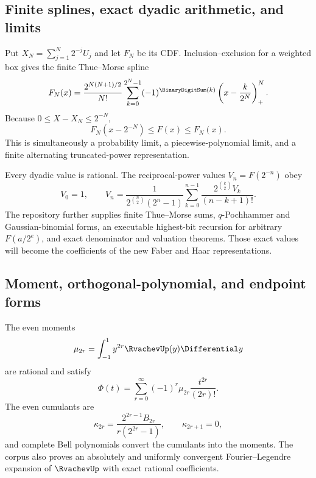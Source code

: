 \documentclass[11pt]{article}
\theoremstyle{definition}
\theoremstyle{remark}
\begin{document}
\subsection{Finite splines, exact dyadic arithmetic, and limits}

\baseline Put $X_N=\sum_{j=1}^N2^{-j}U_j$ and let $F_N$ be its CDF.  Inclusion--exclusion
for a weighted box gives the finite Thue--Morse spline
\begin{equation}
 F_N(x)=\frac{2^{N(N+1)/2}}{N!}
 \sum_{k=0}^{2^N-1}(-1)^{\BinaryDigitSum(k)}
 \left(x-\frac{k}{2^N}\right)_+^N.                      \label{p8:eq:finite-spline}
\end{equation}
Because $0\le X-X_N\le2^{-N}$,
\begin{equation}
 F_N(x-2^{-N})\le F(x)\le F_N(x).                        \label{p8:eq:spline-bracket}
\end{equation}
This is simultaneously a probability limit, a piecewise-polynomial limit,
and a finite alternating truncated-power representation.

Every dyadic value is rational.  The reciprocal-power values
$V_n=F(2^{-n})$ obey
\begin{equation}
 V_0=1,
 \qquad
 V_n=\frac{1}{2^{\binom n2}(2^n-1)}
 \sum_{k=0}^{n-1}
 \frac{2^{\binom k2}V_k}{(n-k+1)!}.                      \label{p8:eq:V-recurrence}
\end{equation}
The repository further supplies finite Thue--Morse sums, $q$-Pochhammer and
Gaussian-binomial forms, an executable highest-bit recursion for arbitrary
$F(a/2^e)$, and exact denominator and valuation theorems.  Those exact values
will become the coefficients of the new Faber and Haar representations.

\subsection{Moment, orthogonal-polynomial, and endpoint forms}

\baseline The even moments
\begin{equation}
 \mu_{2r}=\int_{-1}^{1}y^{2r}\RvachevUp(y)\Differential y
\end{equation}
are rational and satisfy
\begin{equation}
 \Phi(t)=\sum_{r=0}^\infty(-1)^r\mu_{2r}\frac{t^{2r}}{(2r)!}.  \label{p8:eq:moment-series}
\end{equation}
The even cumulants are
\begin{equation}
 \kappa_{2r}=\frac{2^{2r-1}B_{2r}}{r(2^{2r}-1)},
 \qquad \kappa_{2r+1}=0,                                \label{p8:eq:cumulants}
\end{equation}
and complete Bell polynomials convert the cumulants into the moments.
The corpus also proves an absolutely and uniformly convergent
Fourier--Legendre expansion of $\RvachevUp$ with exact rational coefficients.
\end{document}
